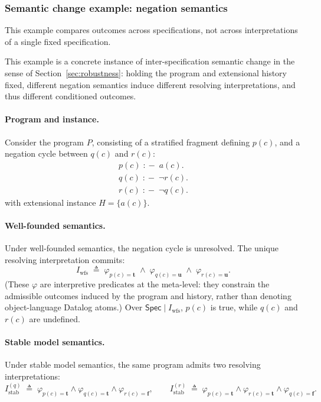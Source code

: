 \documentclass[acmsmall,nonacm]{acmart}
\theoremstyle{remark}
\numberwithin{definition}{section}
\numberwithin{theorem}{section}
\numberwithin{lemma}{section}
\numberwithin{corollary}{section}
\numberwithin{remark}{section}
\numberwithin{example}{section}
\numberwithin{observation}{section}
\numberwithin{assumption}{section}
\newcommand{\Spec}{\mathsf{Spec}}
\newcommand{\drule}{\mathrel{:\!-}}
\begin{document}
\subsubsection{Semantic change example: negation semantics}

This example compares outcomes across specifications, not across interpretations of a single fixed specification.

This example is a concrete instance of inter-specification semantic change in the sense of
Section~\ref{sec:robustness}: holding the program and extensional history fixed,
different negation semantics induce different resolving interpretations, and thus
different conditioned outcomes.

\paragraph{Program and instance.}
Consider the program $P$, consisting of a stratified fragment defining $p(c)$,
and a negation cycle between $q(c)$ and $r(c)$:
\[
\begin{array}{l}
p(c) \;\drule\; a(c).\\
q(c) \;\drule\; \neg r(c).\\
r(c) \;\drule\; \neg q(c).
\end{array}
\]
with extensional instance $H = \{a(c)\}$.

\paragraph{Well-founded semantics.}
Under well-founded semantics, the negation cycle is unresolved.
The unique resolving interpretation commits:
\[
I_{\mathrm{wfs}}
\;\triangleq\;
\varphi_{p(c)=\mathbf{t}}
\;\wedge\;
\varphi_{q(c)=\mathbf{u}}
\;\wedge\;
\varphi_{r(c)=\mathbf{u}} .
\]
(These $\varphi$ are interpretive predicates at the meta-level: they constrain the
admissible outcomes induced by the program and history, rather than denoting
object-language Datalog atoms.)
Over $\Spec \mid I_{\mathrm{wfs}}$, $p(c)$ is true, while $q(c)$ and $r(c)$ are undefined.

\paragraph{Stable model semantics.}
Under stable model semantics, the same program admits two resolving interpretations:
\[
I^{(q)}_{\mathrm{stab}}
\;\triangleq\;
\varphi_{p(c)=\mathbf{t}}
\wedge \varphi_{q(c)=\mathbf{t}}
\wedge \varphi_{r(c)=\mathbf{f}},
\qquad
I^{(r)}_{\mathrm{stab}}
\;\triangleq\;
\varphi_{p(c)=\mathbf{t}}
\wedge \varphi_{r(c)=\mathbf{t}}
\wedge \varphi_{q(c)=\mathbf{f}} .
\]
\end{document}
